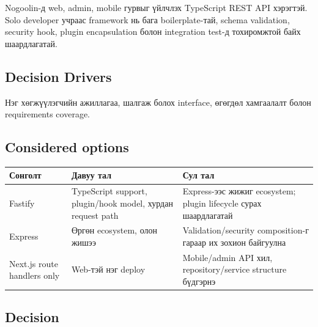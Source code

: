 \documentclass[
  mongolian,
]{article}
\begin{document}
Nogoolin-д web, admin, mobile гурвыг үйлчлэх TypeScript REST API
хэрэгтэй. Solo developer учраас framework нь бага boilerplate-тай,
schema validation, security hook, plugin encapsulation болон integration
test-д тохиромжтой байх шаардлагатай.

\subsection{Decision Drivers}\label{decision-drivers}

Нэг хөгжүүлэгчийн ажиллагаа, шалгаж болох interface, өгөгдөл хамгаалалт
болон requirements coverage.

\subsection{Considered options}\label{considered-options}

\begin{longtable}[]{@{}
  >{\raggedright\arraybackslash}p{}
  >{\raggedright\arraybackslash}p{}
  >{\raggedright\arraybackslash}p{}@{}}
\toprule\noalign{}
\begin{minipage}[b]{\linewidth}\raggedright
Сонголт
\end{minipage} & \begin{minipage}[b]{\linewidth}\raggedright
Давуу тал
\end{minipage} & \begin{minipage}[b]{\linewidth}\raggedright
Сул тал
\end{minipage} \\
\midrule\noalign{}
\endhead
\bottomrule\noalign{}
\endlastfoot
Fastify & TypeScript support, plugin/hook model, хурдан request path &
Express-ээс жижиг ecosystem; plugin lifecycle сурах шаардлагатай \\
Express & Өргөн ecosystem, олон жишээ & Validation/security
composition-г гараар их зохион байгуулна \\
Next.js route handlers only & Web-тэй нэг deploy & Mobile/admin API хил,
repository/service structure бүдгэрнэ \\
\end{longtable}

\subsection{Decision}\label{decision}
\end{document}

